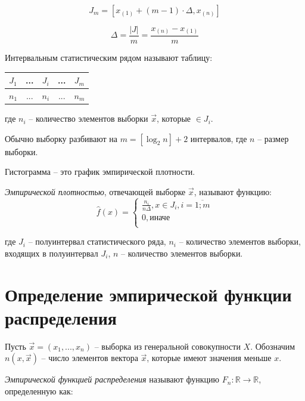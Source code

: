 \documentclass[12pt]{report}
\begin{document}
\begin{equation*}
	J_{m} = [x_{(1)} + (m - 1) \cdot \Delta, x_{(n)}]
\end{equation*}

\begin{equation*}
	\Delta = \frac{|J|}{m} = \frac{x_{(n)} - x_{(1)}}{m}
\end{equation*}

Интервальным статистическим рядом называют таблицу:

\begin{table}[htb]
	\centering
	\begin{tabular}{|c|c|c|c|c|}
		\hline
		$J_1$ & ... & $J_i$ & ... & $J_m$ \\
		\hline
		$n_1$ & ... & $n_i$ & ... & $n_m$ \\
		\hline
	\end{tabular}
\end{table}

где $n_i$ -- количество элементов выборки $\vec x$, которые $\in J_i$.

Обычно выборку разбивают на $m=[\log_2n]+2$ интервалов, где $n$ -- размер выборки.

Гистограмма -- это график эмпирической плотности. 

\textit{Эмпирической плотностью}, отвечающей выборке $\vec x$, называют функцию:
\begin{equation}
	\hat f(x) =
	\begin{cases}
		\frac{n_i}{n \Delta}, x \in J_i, i = \overline{1; m} \\
		0, \text{иначе} \\
	\end{cases}
\end{equation}

где $J_i$ -- полуинтервал статистического ряда, $n_i$ -- количество элементов выборки, входящих в полуинтервал $J_i$, $n$ -- количество элементов выборки.

\section*{Определение эмпирической функции распределения}

Пусть $\vec x = (x_1, ..., x_n)$ -- выборка из генеральной совокупности $X$. Обозначим $n(x, \vec x)$ -- число элементов вектора $\vec x$, которые имеют значения меньше $x$.

\textit{Эмпирической функцией распределения} называют функцию $F_n: \mathbb{R} \to \mathbb{R}$, определенную как: 
\end{document}
